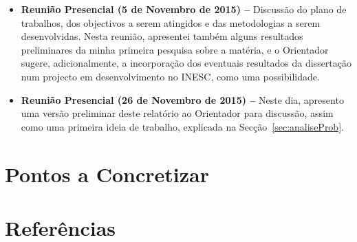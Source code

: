 \documentclass[a4paper, onecolumn, 10pt]{article}
\begin{document}
\begin{itemize}
		\item
			\textbf{Reunião Presencial (5 de Novembro de 2015) --} Discussão do plano de trabalhos, dos objectivos a serem atingidos e das metodologias a serem desenvolvidas. Nesta reunião, apresentei também alguns resultados preliminares da minha primeira pesquisa sobre a matéria, e o Orientador sugere, adicionalmente, a incorporação dos eventuais resultados da dissertação num projecto em desenvolvimento no INESC, como uma possibilidade.

		\item
			\textbf{Reunião Presencial (26 de Novembro de 2015) --} Neste dia, apresento uma versão preliminar deste relatório ao Orientador para discussão, assim como uma primeira ideia de trabalho, explicada na Secção~\ref{sec:analiseProb}.
	\end{itemize}

	\section{Pontos a Concretizar}

	\section{Referências}
\end{document}
